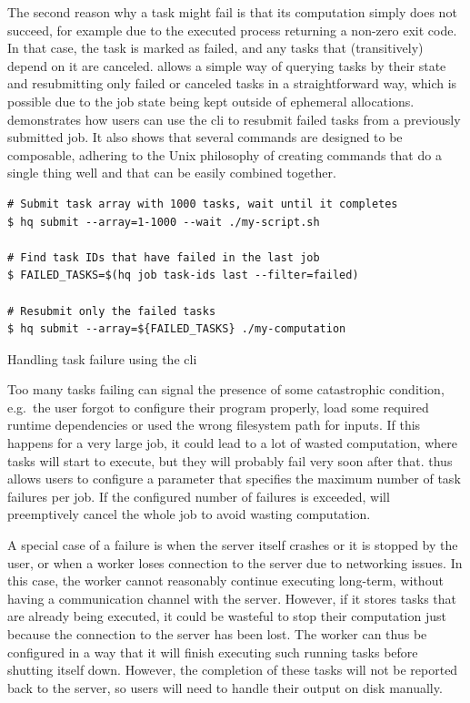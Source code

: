 The second reason why a task might fail is that its computation simply does not succeed, for
example due to the executed process returning a non-zero exit code. In that case, the task is
marked as failed, and any tasks that (transitively) depend on it are canceled.
\hyperqueue{} allows a simple way of querying tasks by their state and resubmitting only
failed or canceled tasks in a straightforward way, which is possible due to the job state being
kept outside of ephemeral allocations.~ demonstrates how users can use the
\hq{} \gls{cli} to resubmit failed tasks from a previously
submitted job. It also shows that several \hq{} commands are designed to be
composable, adhering to the Unix philosophy of creating commands that do a single thing well and
that can be easily combined together.

\begin{listing}[h]
	\begin{verbatim}
# Submit task array with 1000 tasks, wait until it completes
$ hq submit --array=1-1000 --wait ./my-script.sh

# Find task IDs that have failed in the last job
$ FAILED_TASKS=$(hq job task-ids last --filter=failed)

# Resubmit only the failed tasks
$ hq submit --array=${FAILED_TASKS} ./my-computation
	\end{verbatim}
	\caption{Handling task failure using the \hyperqueue{} \gls{cli}}
	\label{lst:hq-cli-fault-tolerance}
\end{listing}

Too many tasks failing can signal the presence of some catastrophic condition, e.g.\ the user
forgot to configure their program properly, load some required runtime dependencies or used the
wrong filesystem path for inputs. If this happens for a very large job, it could lead to a lot of
wasted computation, where tasks will start to execute, but they will probably fail very soon after
that. \hyperqueue{} thus allows users to configure a parameter that specifies the maximum
number of task failures per job. If the configured number of failures is exceeded,
\hq{} will preemptively cancel the whole job to avoid wasting computation.

A special case of a failure is when the server itself crashes or it is stopped by the user, or when
a worker loses connection to the server due to networking issues. In this case, the worker cannot
reasonably continue executing long-term, without having a communication channel with the server.
However, if it stores tasks that are already being executed, it could be wasteful to stop their
computation just because the connection to the server has been lost. The worker can thus be
configured in a way that it will finish executing such running tasks before shutting itself down.
However, the completion of these tasks will not be reported back to the server, so users will need
to handle their output on disk manually.

